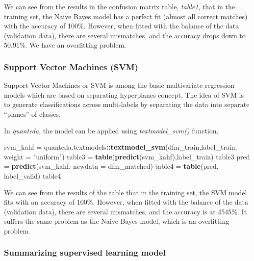 \documentclass[
]{article}
\newenvironment{Shaded}{\begin{snugshade}}{\end{snugshade}}
\newcommand{\AttributeTok}[1]{\textcolor[rgb]{0.13,0.29,0.53}{#1}}
\newcommand{\FunctionTok}[1]{\textcolor[rgb]{0.13,0.29,0.53}{\textbf{#1}}}
\newcommand{\NormalTok}[1]{#1}
\newcommand{\OtherTok}[1]{\textcolor[rgb]{0.56,0.35,0.01}{#1}}
\newcommand{\SpecialCharTok}[1]{\textcolor[rgb]{0.81,0.36,0.00}{\textbf{#1}}}
\newcommand{\StringTok}[1]{\textcolor[rgb]{0.31,0.60,0.02}{#1}}
\begin{document}
\normalsize

We can see from the results in the confusion matrix table, \emph{table1}, that in the training set, the Naive Bayes model has a perfect fit (almost all correct matches) with the accuracy of 100\%. However, when fitted with the balance of the data (validation data), there are several mismatches, and the accuracy drops down to 50.91\%. We have an overfitting problem.

\hypertarget{support-vector-machines-svm}{%
\subsubsection{Support Vector Machines (SVM)}\label{support-vector-machines-svm}}

Support Vector Machines or SVM is among the basic multivariate regression models which are based on separating hyperplanes concept. The idea of SVM is to generate classifications across multi-labels by separating the data into separate ``planes'' of classes.

In \emph{quanteda}, the model can be applied using \emph{textmodel\_svm()} function.

\footnotesize

\begin{Shaded}
\begin{Highlighting}[]
\NormalTok{svm\_kahf }\OtherTok{=}\NormalTok{ quanteda.textmodels}\SpecialCharTok{::}\FunctionTok{textmodel\_svm}\NormalTok{(dfm\_train,label\_train, }\AttributeTok{weight =} \StringTok{"uniform"}\NormalTok{)}
\NormalTok{table3 }\OtherTok{=} \FunctionTok{table}\NormalTok{(}\FunctionTok{predict}\NormalTok{(svm\_kahf),label\_train)}
\NormalTok{table3}
\NormalTok{pred }\OtherTok{=} \FunctionTok{predict}\NormalTok{(svm\_kahf, }\AttributeTok{newdata =}\NormalTok{ dfm\_matched)}
\NormalTok{table4 }\OtherTok{=} \FunctionTok{table}\NormalTok{(pred, label\_valid)}
\NormalTok{table4}
\end{Highlighting}
\end{Shaded}

\normalsize

We can see from the results of the table that in the training set, the SVM model fits with an accuracy of 100\%. However, when fitted with the balance of the data (validation data), there are several mismatches, and the accuracy is at 4545\%. It suffers the same problem as the Naive Bayes model, which is an overfitting problem.

\hypertarget{summarizing-supervised-learning-model}{%
\subsubsection{Summarizing supervised learning model}\label{summarizing-supervised-learning-model}}
\end{document}
